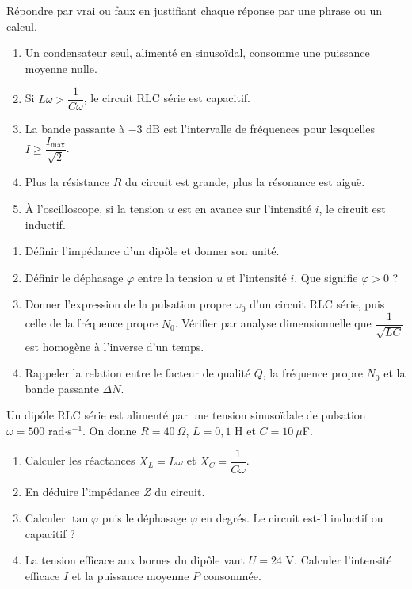 \documentclass[11pt]{article}
\newcommand{\cle}[1]{{\popxbold\color{popdark}#1}}
\begin{document}
\begin{exercice}
Répondre par vrai ou faux en justifiant chaque réponse par une phrase ou un calcul.
\begin{enumerate}
\item Un condensateur seul, alimenté en sinusoïdal, consomme une puissance moyenne nulle.
\item Si $L\omega > \dfrac{1}{C\omega}$, le circuit RLC série est capacitif.
\item La bande passante à $-3$ dB est l'intervalle de fréquences pour lesquelles $I \geq \dfrac{I_{\max}}{\sqrt{2}}$.
\item Plus la résistance $R$ du circuit est grande, plus la résonance est aiguë.
\item À l'oscilloscope, si la tension $u$ est en avance sur l'intensité $i$, le circuit est inductif.
\end{enumerate}
\end{exercice}

\begin{exercice}
\begin{enumerate}
\item Définir l'\cle{impédance} d'un dipôle et donner son unité.
\item Définir le \cle{déphasage} $\varphi$ entre la tension $u$ et l'intensité $i$. Que signifie $\varphi > 0$ ?
\item Donner l'expression de la pulsation propre $\omega_0$ d'un circuit RLC série, puis celle de la fréquence propre $N_0$. Vérifier par analyse dimensionnelle que $\dfrac{1}{\sqrt{LC}}$ est homogène à l'inverse d'un temps.
\item Rappeler la relation entre le facteur de qualité $Q$, la fréquence propre $N_0$ et la bande passante $\Delta N$.
\end{enumerate}
\end{exercice}

\begin{exercice}
Un dipôle RLC série est alimenté par une tension sinusoïdale de pulsation $\omega = 500$ rad$\cdot$s$^{-1}$. On donne $R = 40\ \Omega$, $L = 0{,}1$ H et $C = 10\ \mu$F.
\begin{enumerate}
\item Calculer les réactances $X_L = L\omega$ et $X_C = \dfrac{1}{C\omega}$.
\item En déduire l'impédance $Z$ du circuit.
\item Calculer $\tan\varphi$ puis le déphasage $\varphi$ en degrés. Le circuit est-il inductif ou capacitif ?
\item La tension efficace aux bornes du dipôle vaut $U = 24$ V. Calculer l'intensité efficace $I$ et la puissance moyenne $P$ consommée.
\end{enumerate}
\end{exercice}
\end{document}
